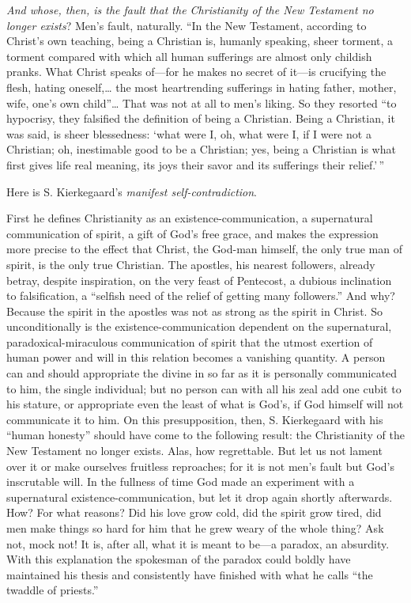 \documentclass[12pt,a4paper,openany]{book}
\newcommand{\opage}[1]{\marginnote{\footnotesize\textit{[#1]}}}
\begin{document}
\emph{And whose, then, is the fault that the Christianity of the New
Testament no longer exists}? \opage{73}Men's fault, naturally. ``In the New
Testament, according to Christ's own teaching, being a Christian is,
humanly speaking, sheer torment, a torment compared with which all human
sufferings are almost only childish pranks. What Christ speaks of---for he
makes no secret of it---is crucifying the flesh, hating oneself,\dots{}
the most heartrending sufferings in hating father, mother, wife, one's
own child''\dots{} That was not at all to men's liking. So they resorted
``to hypocrisy, they falsified the definition of being a Christian. Being
a Christian, it was said, is sheer blessedness: `what were I, oh, what
were I, if I were not a Christian; oh, inestimable good to be a
Christian; yes, being a Christian is what first gives life real meaning,
its joys their savor and its sufferings their relief.'\,''

Here is S. Kierkegaard's \emph{manifest self-contradiction}.

First he defines Christianity as an existence-communication, a
supernatural communication of spirit, a gift of God's free grace, and
makes the expression more precise %
to the effect that Christ, the God-man himself, the only true man of
spirit, is the only true Christian. The apostles, his nearest followers,
already betray, despite inspiration, on the very feast of Pentecost, a
dubious inclination to falsification, a ``selfish need of the relief of
getting many followers.'' And why? Because the spirit in the apostles was
not as strong as the spirit in Christ. So unconditionally is the
existence-communication dependent on the supernatural,
paradoxical-miraculous communication of spirit that the utmost exertion
of human power and will in this relation becomes a vanishing \opage{74}quantity. A
person can and should appropriate the divine in so far as it is
personally communicated to him, the single individual; but no person can
with all his zeal add one cubit to his stature, or appropriate even the
least of what is God's, if God himself will not communicate it to him.
On this presupposition, then, S. Kierkegaard with his ``human honesty''
should have come to the following result: the Christianity of the New
Testament no longer exists. Alas, how regrettable. But let us not lament
over it or make ourselves fruitless reproaches; for it is not men's fault
but God's inscrutable will. In the fullness of time God made an
experiment with a supernatural existence-communication, but let it drop
again shortly afterwards. How? For what reasons? Did his love grow cold,
did the spirit grow tired, did men make things so hard for him that he
grew weary of the whole thing? Ask not, mock not! It is, after all, what
it is meant to be---a paradox, an absurdity. With this explanation the
spokesman of the paradox could boldly have maintained his thesis and
consistently have finished with what he calls ``the twaddle of priests.''
\end{document}
